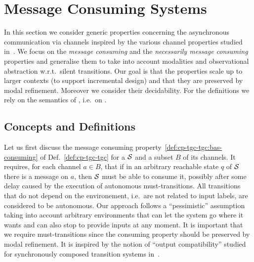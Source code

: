 \section{Message Consuming Systems}\label{sec:mcs}

In this section we consider generic properties concerning the asynchronous communication via channels
inspired by the various channel properties studied in~\cite{haddad-et-al-2013}.
We focus on the \emph{message consuming} and the \emph{necessarily message consuming} properties
and generalise them to take into account modalities and observational abstraction w.r.t.\ silent transitions.
Our goal is that the properties scale up to larger contexts (to support incremental design)
and that they are preserved by modal refinement. Moreover we consider their decidability.
For the definitions %
we rely on the semantics of \MAIOPNs, i.e.\ on \MAIOTSs.

\subsection{Concepts and Definitions}\label{subsec:mcs}

Let us first discuss the message consuming property~\ref{def:cp-tgc-tgc:bas-consuming}
of Def.~\ref{def:cp-tgc-tgc} for a \MAIOTS $\S$ and a subset $B$ of its channels.
It requires,
for each channel $a \in B$, that if in an arbitrary reachable state $q$ of $\S$ there is a message on $a$, then $\S$ must be able
to consume it, possibly after some delay caused by the execution of autonomous must-transitions.
All transitions that do not depend on the environement, i.e.\ are not related to input labels,
are considered to be autonomous. Our approach follows a ``pessimistic'' assumption taking into account arbitrary environments
that can let the system go where it wants and can also stop to provide inputs at any moment.
 It is important that we require must-transitions
since the consuming property should be preserved by modal refinement.
It is inspired by the notion of ``output compatibility'' studied for synchronously composed transition systems in~\cite{hennicker_knapp_2011}.

